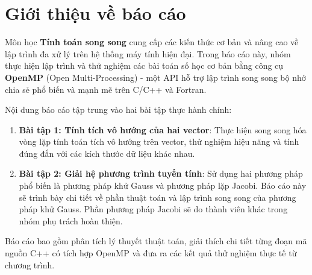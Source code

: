 ﻿\chapter*{Giới thiệu về báo cáo}

Môn học \textbf{Tính toán song song} cung cấp các kiến thức cơ bản và nâng cao về lập trình đa xử lý trên hệ thống máy tính hiện đại. Trong báo cáo này, nhóm thực hiện lập trình và thử nghiệm các bài toán số học cơ bản bằng công cụ \textbf{OpenMP} (Open Multi-Processing) - một API hỗ trợ lập trình song song bộ nhớ chia sẻ phổ biến và mạnh mẽ trên C/C++ và Fortran.

Nội dung báo cáo tập trung vào hai bài tập thực hành chính:
\begin{enumerate}
    \item \textbf{Bài tập 1: Tính tích vô hướng của hai vector}: Thực hiện song song hóa vòng lặp tính toán tích vô hướng trên vector, thử nghiệm hiệu năng và tính đúng đắn với các kích thước dữ liệu khác nhau.
    \item \textbf{Bài tập 2: Giải hệ phương trình tuyến tính}: Sử dụng hai phương pháp phổ biến là phương pháp khử Gauss và phương pháp lặp Jacobi. Báo cáo này sẽ trình bày chi tiết về phần thuật toán và lập trình song song của phương pháp khử Gauss. Phần phương pháp Jacobi sẽ do thành viên khác trong nhóm phụ trách hoàn thiện.
\end{enumerate}

Báo cáo bao gồm phân tích lý thuyết thuật toán, giải thích chi tiết từng đoạn mã nguồn C++ có tích hợp OpenMP và đưa ra các kết quả thử nghiệm thực tế từ chương trình.

